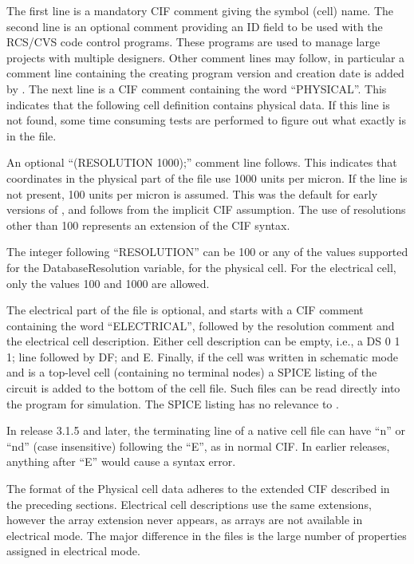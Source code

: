 The first line is a mandatory CIF comment giving the symbol (cell)
name.  The second line is an optional comment providing an ID field to
be used with the RCS/CVS code control programs.  These programs are
used to manage large projects with multiple designers.  Other comment
lines may follow, in particular a comment line containing the creating
program version and creation date is added by {\Xic}.  The next line
is a CIF comment containing the word ``PHYSICAL''.  This indicates
that the following cell definition contains physical data.  If this
line is not found, some time consuming tests are performed to figure
out what exactly is in the file.

An optional ``{\vt (RESOLUTION 1000);}'' comment line follows.  This
indicates that coordinates in the physical part of the file use 1000
units per micron.  If the line is not present, 100 units per micron is
assumed.  This was the default for early versions of {\Xic}, and
follows from the implicit CIF assumption.  The use of resolutions
other than 100 represents an extension of the CIF syntax.

The integer following ``{\vt RESOLUTION}'' can be 100 or any of the
values supported for the {\et DatabaseResolution} variable, for the
physical cell.  For the electrical cell, only the values 100 and 1000
are allowed.

The electrical part of the file is optional, and starts with a CIF
comment containing the word ``ELECTRICAL'', followed by the resolution
comment and the electrical cell description.  Either cell description
can be empty, i.e., a {\vt DS 0 1 1;} line followed by {\vt DF;} and
{\vt E}.  Finally, if the cell was written in schematic mode and is a
top-level cell (containing no terminal nodes) a SPICE listing of the
circuit is added to the bottom of the cell file.  Such files can be
read directly into the {\WRspice} program for simulation.  The SPICE
listing has no relevance to {\Xic}.

In release 3.1.5 and later, the terminating line of a native cell file
can have ``{\vt n}'' or ``{\vt nd}'' (case insensitive) following the
``{\vt E}'', as in normal CIF.  In earlier releases, anything after
``{\vt E}'' would cause a syntax error.

The format of the Physical cell data adheres to the extended CIF
described in the preceding sections.  Electrical cell descriptions use
the same extensions, however the array extension never appears, as
arrays are not available in electrical mode.  The major difference in
the files is the large number of properties assigned in electrical
mode.


